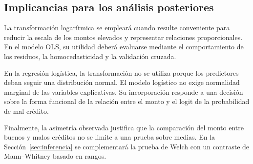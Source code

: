 \subsection{Implicancias para los análisis posteriores}

La transformación logarítmica se empleará cuando resulte conveniente
para reducir la escala de los montos elevados y representar relaciones
proporcionales. En el modelo OLS, su utilidad deberá evaluarse mediante
el comportamiento de los residuos, la homocedasticidad y la validación
cruzada.

En la regresión logística, la transformación no se utiliza porque los
predictores deban seguir una distribución normal. El modelo logístico no
exige normalidad marginal de las variables explicativas. Su incorporación
responde a una decisión sobre la forma funcional de la relación entre el
monto y el logit de la probabilidad de mal crédito.

Finalmente, la asimetría observada justifica que la comparación del monto
entre buenos y malos créditos no se limite a una prueba sobre medias. En
la Sección~\ref{sec:inferencia} se complementará la prueba de Welch con
un contraste de Mann--Whitney basado en rangos.

